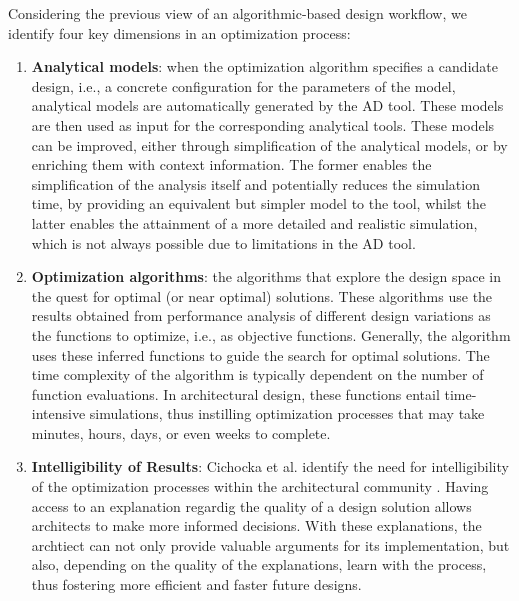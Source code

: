 	Considering the previous view of an algorithmic-based design workflow, we identify four key dimensions in an optimization process:
	
\begin{enumerate}
\item \textbf{Analytical models}: when the optimization algorithm specifies a candidate design, i.e., a concrete configuration for the parameters of the model, analytical models are automatically generated by the \ac{AD} tool. These models are then used as input for the corresponding analytical tools. These models can be improved, either through simplification of the analytical models, or by enriching them with context information. The former enables the simplification of the analysis itself and potentially reduces the simulation time, by providing an equivalent but simpler model to the tool, whilst the latter enables the attainment of a more detailed and realistic simulation, which is not always possible due to limitations in the \ac{AD} tool. 

\item \textbf{Optimization algorithms}: the algorithms that explore the design space in the quest for optimal (or near optimal) solutions. These algorithms use the results obtained from performance analysis of different design variations as the functions to optimize, i.e., as objective functions. Generally, the algorithm uses these inferred functions to guide the search for optimal solutions. The time complexity of the algorithm is typically dependent on the number of function evaluations. In architectural design, these functions entail time-intensive simulations, thus instilling optimization processes that may take minutes, hours, days, or even weeks to complete.

\item \textbf{Intelligibility of Results}: Cichocka et al. identify the need for intelligibility of the optimization processes within the architectural community \cite{Cichocka2017SURVEY}. Having access to an explanation regardig the quality of a design solution allows architects to make more informed decisions. With these explanations, the archtiect can not only provide valuable arguments for its implementation, but also, depending on the quality of the explanations, learn with the process, thus fostering more efficient and faster future designs. 


\end{enumerate}
